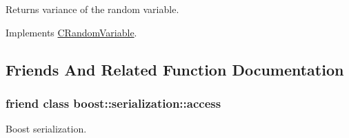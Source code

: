 Returns variance of the random variable. 



Implements \hyperlink{class_c_random_variable_a3b0b87c4aab74c0406cd8321b8b96747}{C\-Random\-Variable}.



\subsection{Friends And Related Function Documentation}
\hypertarget{class_c_uniform_d_r_v_ac98d07dd8f7b70e16ccb9a01abf56b9c}{
\subsubsection[{boost\-::serialization\-::access}]{\setlength{\rightskip}{0pt plus 5cm}friend class boost\-::serialization\-::access\hspace{0.3cm}{\ttfamily [friend]}}}\label{class_c_uniform_d_r_v_ac98d07dd8f7b70e16ccb9a01abf56b9c}


Boost serialization. 



